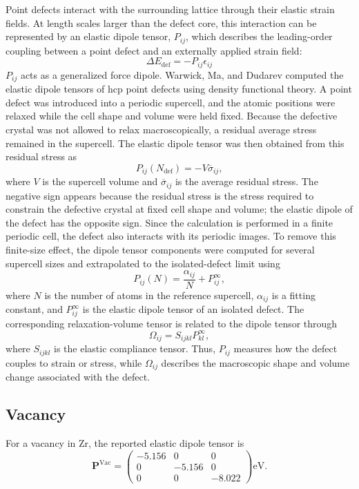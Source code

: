 \documentclass[10pt]{article}
\begin{document}
Point defects interact with the surrounding lattice through their elastic strain fields. At length scales larger than the defect core, this interaction can be represented by an elastic dipole tensor, $P_{ij}$, which describes the leading-order coupling between a point defect and an externally applied strain field: \begin{equation} 
\Delta E_{\mathrm{def}} = -P_{ij}\epsilon_{ij} 
\end{equation} 
$P_{ij}$ acts as a generalized force dipole.  Warwick, Ma, and Dudarev computed the elastic dipole tensors of hcp point defects using density functional theory. A point defect was introduced into a periodic supercell, and the atomic positions were relaxed while the cell shape and volume were held fixed. Because the defective crystal was not allowed to relax macroscopically, a residual average stress remained in the supercell. The elastic dipole tensor was then obtained from this residual stress as 
\begin{equation} 
P_{ij}(N_{\mathrm{def}}) = -V\overline{\sigma}_{ij}, 
\end{equation} 
where $V$ is the supercell volume and $\overline{\sigma}_{ij}$ is the average residual stress. The negative sign appears because the residual stress is the stress required to constrain the defective crystal at fixed cell shape and volume; the elastic dipole of the defect has the opposite sign. Since the calculation is performed in a finite periodic cell, the defect also interacts with its periodic images. To remove this finite-size effect, the dipole tensor components were computed for several supercell sizes and extrapolated to the isolated-defect limit using 
\begin{equation} 
P_{ij}(N) = \frac{\alpha_{ij}}{N} + P_{ij}^{\infty}, 
\end{equation} 
where $N$ is the number of atoms in the reference supercell, $\alpha_{ij}$ is a fitting constant, and $P_{ij}^{\infty}$ is the elastic dipole tensor of an isolated defect. The corresponding relaxation-volume tensor is related to the dipole tensor through 
\begin{equation} 
\Omega_{ij}=S_{ijkl}P_{kl}^{\infty}, 
\label{eq:relaxation_volume_tensor} 
\end{equation} 
where $S_{ijkl}$ is the elastic compliance tensor. Thus, $P_{ij}$ measures how the defect couples to strain or stress, while $\Omega_{ij}$ describes the macroscopic shape and volume change associated with the defect.

\subsection{Vacancy}
For a vacancy in Zr, the reported elastic dipole tensor is 
\begin{equation} 
\mathbf{P}^{\mathrm{Vac}} = 
\begin{pmatrix}
-5.156 & 0 & 0 \\ 
0 & -5.156 & 0 \\ 
0 & 0 & -8.022 
\end{pmatrix} \mathrm{eV}. 
\end{equation} 
\end{document}
